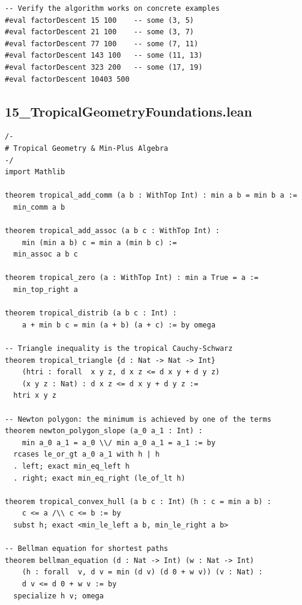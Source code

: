 \documentclass[11pt,openright,twoside]{book}
\theoremstyle{definition}
\begin{document}
\begin{lstlisting}[style=lean]
-- Verify the algorithm works on concrete examples
#eval factorDescent 15 100    -- some (3, 5)
#eval factorDescent 21 100    -- some (3, 7)
#eval factorDescent 77 100    -- some (7, 11)
#eval factorDescent 143 100   -- some (11, 13)
#eval factorDescent 323 200   -- some (17, 19)
#eval factorDescent 10403 500
\end{lstlisting}

\clearpage


\subsection*{15\_TropicalGeometryFoundations.lean}
\label{lean:15_TropicalGeometryFoundations}

\begin{lstlisting}[style=lean]
/-
# Tropical Geometry & Min-Plus Algebra
-/
import Mathlib

theorem tropical_add_comm (a b : WithTop Int) : min a b = min b a :=
  min_comm a b

theorem tropical_add_assoc (a b c : WithTop Int) :
    min (min a b) c = min a (min b c) :=
  min_assoc a b c

theorem tropical_zero (a : WithTop Int) : min a True = a :=
  min_top_right a

theorem tropical_distrib (a b c : Int) :
    a + min b c = min (a + b) (a + c) := by omega

-- Triangle inequality is the tropical Cauchy-Schwarz
theorem tropical_triangle {d : Nat -> Nat -> Int}
    (htri : forall  x y z, d x z <= d x y + d y z)
    (x y z : Nat) : d x z <= d x y + d y z :=
  htri x y z

-- Newton polygon: the minimum is achieved by one of the terms
theorem newton_polygon_slope (a_0 a_1 : Int) :
    min a_0 a_1 = a_0 \\/ min a_0 a_1 = a_1 := by
  rcases le_or_gt a_0 a_1 with h | h
  . left; exact min_eq_left h
  . right; exact min_eq_right (le_of_lt h)

theorem tropical_convex_hull (a b c : Int) (h : c = min a b) :
    c <= a /\\ c <= b := by
  subst h; exact <min_le_left a b, min_le_right a b>

-- Bellman equation for shortest paths
theorem bellman_equation (d : Nat -> Int) (w : Nat -> Int)
    (h : forall  v, d v = min (d v) (d 0 + w v)) (v : Nat) :
    d v <= d 0 + w v := by
  specialize h v; omega

\end{lstlisting}
\end{document}
